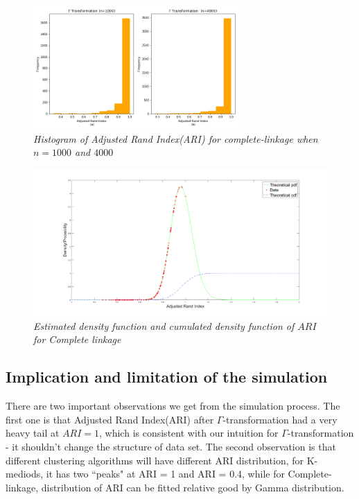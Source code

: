 \documentclass{uonmathreport}
\begin{document}
\begin{figure}[H]
 \begin{center}
   \includegraphics[width=0.7\textwidth]{simulate2_1.png}
 \end{center}
 \caption{\textit{Histogram of Adjusted Rand Index(ARI) for complete-linkage when $n=1000$ and $4000$ }}
 \label{fig:single-linkage}
\end{figure}

\begin{figure}[H]
 \begin{center}
   \includegraphics[width=1\textwidth]{Complete-linkage-cdf.png}
 \end{center}
 \caption{\textit{Estimated density function and cumulated density function of $ARI$ for Complete linkage}}
 \label{fig:single-linkage2}
\end{figure}

\subsection{Implication and limitation of the simulation} \label{subsec: simulationSum}
There are two important observations we get from the simulation process. The first one is that Adjusted Rand Index(ARI) after $\Gamma$-transformation had a very heavy tail at $ARI=1$, which is consistent with our intuition for $\Gamma$-transformation - it shouldn't change the structure of data set. The second observation is that different clustering algorithms will have different ARI distribution, for K-mediods, it has two 	``peaks" at ARI = 1 and ARI = 0.4, while for Complete-linkage, distribution of ARI can be fitted relative good by Gamma distribution. 
\end{document}
